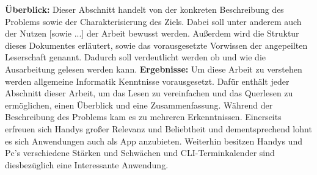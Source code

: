 \myCheckmark

\textbf{Überblick:}
Dieser Abschnitt handelt von der konkreten Beschreibung des Problems sowie der Charakterisierung des Ziels. Dabei soll unter anderem auch der Nutzen [sowie ...] der Arbeit bewusst werden.\newline
Außerdem wird die Struktur dieses Dokumentes erläutert, sowie das vorausgesetzte Vorwissen der angepeilten Leserschaft genannt. Dadurch soll verdeutlicht werden ob und wie die Ausarbeitung gelesen werden kann.\newline
\textbf{Ergebnisse:}
Um diese Arbeit zu verstehen werden allgemeine Informatik Kenntnisse vorausgesetzt. Dafür enthält jeder Abschnitt dieser Arbeit, um das Lesen zu vereinfachen und das Querlesen zu ermöglichen, einen Überblick und eine Zusammenfassung.\newline
Während der Beschreibung des Problems kam es zu mehreren Erkenntnissen. Einerseits erfreuen sich Handys großer Relevanz und Beliebtheit und dementsprechend lohnt es sich Anwendungen auch als App anzubieten. Weiterhin besitzen Handys und Pc's verschiedene Stärken und Schwächen und CLI-Terminkalender sind diesbezüglich eine Interessante Anwendung.